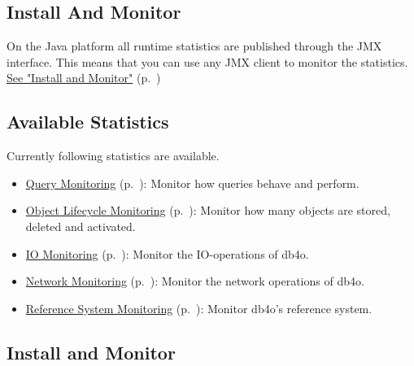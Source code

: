 \subsection*{Install And Monitor}

On the Java platform all runtime statistics are published through the JMX interface. This means that you can use any JMX client to monitor the statistics. \hyperref[ref:advanced-topics-runtime-statistics-install-and-monitor]{See "Install and Monitor"} (p.~\pageref{ref:advanced-topics-runtime-statistics-install-and-monitor})

\subsection*{Available Statistics}

Currently following statistics are available.

\begin{itemize}
\item \hyperref[ref:advanced-topics-runtime-statistics-monitor-queries]{Query Monitoring} (p.~\pageref{ref:advanced-topics-runtime-statistics-monitor-queries}): Monitor how queries behave and perform.
\item \hyperref[ref:advanced-topics-runtime-statistics-monitor-object-lifecycle]{Object Lifecycle Monitoring} (p.~\pageref{ref:advanced-topics-runtime-statistics-monitor-object-lifecycle}): Monitor how many objects are stored, deleted and activated.
\item \hyperref[ref:advanced-topics-runtime-statistics-monitor-io]{IO Monitoring} (p.~\pageref{ref:advanced-topics-runtime-statistics-monitor-io}): Monitor the IO-operations of db4o.
\item \hyperref[ref:advanced-topics-runtime-statistics-monitor-network]{Network Monitoring} (p.~\pageref{ref:advanced-topics-runtime-statistics-monitor-network}): Monitor the network operations of db4o.
\item \hyperref[ref:advanced-topics-runtime-statistics-monitor-reference-system]{Reference System Monitoring} (p.~\pageref{ref:advanced-topics-runtime-statistics-monitor-reference-system}): Monitor db4o's reference system.
\end{itemize}

\subsection{Install and Monitor}
\label{ref:advanced-topics-runtime-statistics-install-and-monitor}

